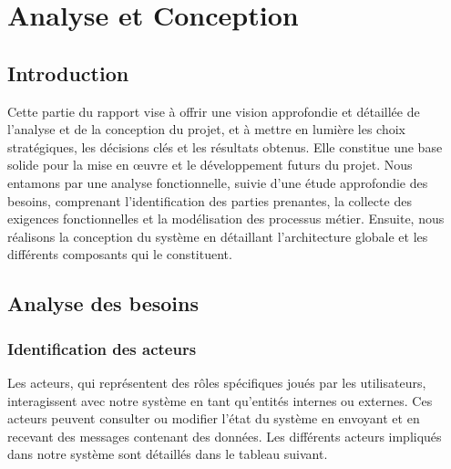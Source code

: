 \chapter{Analyse et Conception}
\label{chap:Analysis and Design}
\section*{Introduction}

\hspace{\parindent}Cette partie du rapport vise à offrir une vision approfondie et détaillée de l'analyse et de la conception du projet, et à mettre en lumière les choix stratégiques, les décisions clés et les résultats obtenus. Elle constitue une base solide pour la mise en œuvre et le développement futurs du projet. Nous entamons par une analyse fonctionnelle, suivie d'une étude approfondie des besoins, comprenant l'identification des parties prenantes, la collecte des exigences fonctionnelles et la modélisation des processus métier. Ensuite, nous réalisons la conception du système en détaillant l'architecture globale et les différents composants qui le constituent.
\pagebreak







\section{Analyse des besoins}
\subsection{Identification des acteurs}

\hspace{\parindent}Les acteurs, qui représentent des rôles spécifiques joués par les utilisateurs, interagissent avec notre système en tant qu'entités internes ou externes. Ces acteurs peuvent consulter ou modifier l'état du système en envoyant et en recevant des messages contenant des données. Les différents acteurs impliqués dans notre système sont détaillés dans le tableau suivant.

